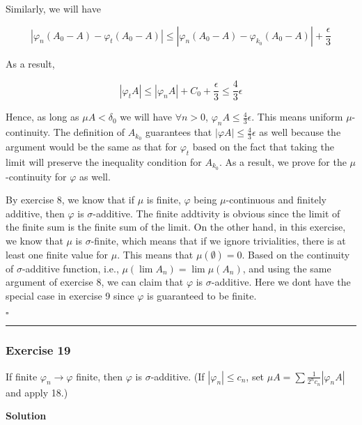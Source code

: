 \documentclass[
]{article}
\begin{document}
Similarly, we will have

\[\left|\varphi_n\left(A_0-A\right)-\varphi_{t}\left(A_0-A\right)\right|  \le \left|\varphi_n\left(A_0-A\right)-\varphi_{k_0}\left(A_0-A\right)\right| + \frac{\epsilon}{3}\]

As a result,

\[|\varphi_t A| \le |\varphi_n A|+ C_0 + \frac{\epsilon}{3} \le \frac{4}{3}\epsilon\]

Hence, as long as \(\mu A < \delta_0\) we will have \(\forall n > 0\),
\(\varphi_n A \le \frac{4}{3}\epsilon \). This means uniform
\(\mu\)-continuity. The definition of \(A_{k_0}\) guarantees that
\(|\varphi A| \le \frac{4}{3}\epsilon\) as well because the argument
would be the same as that for \(\varphi_t\) based on the fact that
taking the limit will preserve the inequality condition for \(A_{k_0}\).
As a result, we prove for the \(\mu\)-continuity for \(\varphi\) as
well.

By exercise 8, we know that if \(\mu\) is finite, \(\varphi\) being
\(\mu\)-continuous and finitely additive, then \(\varphi\) is
\(\sigma\)-additive. The finite addtivity is obvious since the limit of
the finite sum is the finite sum of the limit. On the other hand, in
this exercise, we know that \(\mu\) is \(\sigma\)-finite, which means
that if we ignore trivialities, there is at least one finite value for
\(\mu\). This means that \(\mu(\emptyset) = 0\). Based on the continuity
of \(\sigma\)-additive function, i.e.,
\(\mu(\lim A_n) = \lim \mu(A_n)\), and using the same argument of
exercise 8, we can claim that \(\varphi\) is \(\sigma\)-additive. Here
we don\textquotesingle t have the special case in exercise 9 since
\(\varphi\) is guaranteed to be finite.

\(\square\)

\begin{center}\rule{0.5\linewidth}{0.5pt}\end{center}

\hypertarget{exercise-19}{%
  \subsubsection{Exercise 19}\label{exercise-19}}

If finite \(\varphi_n \rightarrow \varphi\) finite, then \(\varphi\) is
\(\sigma\)-additive. (If \(\left|\varphi_n\right| \le c_n\), set
\(\mu A=\sum \frac{1}{2^n c_n}\left|\varphi_n A\right|\) and apply 18.)

\textbf{Solution}
\end{document}

